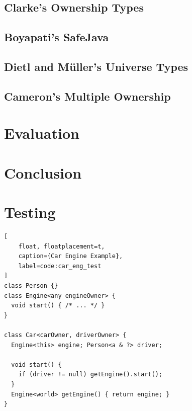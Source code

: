 \documentclass{acm_proc_article-sp}
\begin{document}
\lipsum[6]

\subsection{Clarke's Ownership Types}
\label{subsec:clarke}

\lipsum[7]

\subsection{Boyapati's SafeJava}
\label{subsec:boyapati}

\lipsum[8]

\subsection{Dietl and M\"{u}ller's Universe Types}
\label{subsec:dietl}

\lipsum[9]

\subsection{Cameron's Multiple Ownership}
\label{subsec:cameron}

\lipsum[10]



\section{Evaluation}
\label{sec:eval}

\lipsum[11]




\section{Conclusion}
\label{sec:conclude}

\lipsum[12]








\section{Testing}
\label{sec:test}

\begin{lstlisting}[
	float, floatplacement=t,
	caption={Car Engine Example},
	label=code:car_eng_test
]
class Person {}
class Engine<any engineOwner> {
  void start() { /* ... */ }
}

class Car<carOwner, driverOwner> {
  Engine<this> engine; Person<a & ?> driver;
    
  void start() {
    if (driver != null) getEngine().start();
  }
  Engine<world> getEngine() { return engine; }
}
\end{lstlisting}
\end{document}
